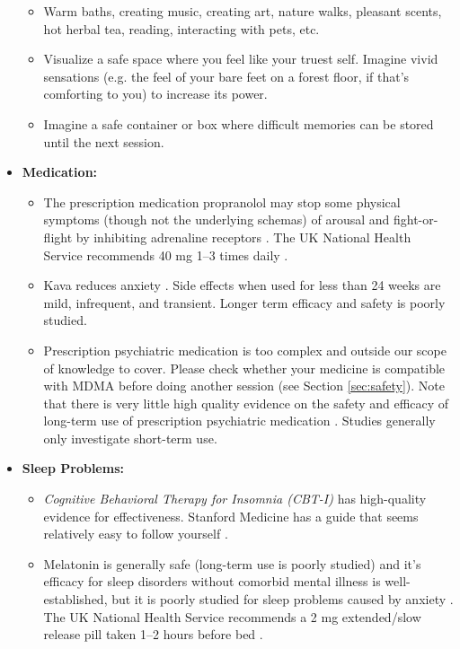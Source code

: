 \documentclass[12pt,letterpaper]{book}
\begin{document}
\begin{itemize}
\begin{itemize}
        \item Warm baths, creating music, creating art, nature walks, pleasant scents, hot herbal tea, reading, interacting with pets, etc.
        \item Visualize a safe space where you feel like your truest self. Imagine vivid sensations (e.g. the feel of your bare feet on a forest floor, if that's comforting to you) to increase its power.
        \item Imagine a safe container or box where difficult memories can be stored until the next session.
    \end{itemize}
    \item \textbf{Medication:}
    \begin{itemize}
        \item The prescription medication propranolol may stop some physical symptoms (though not the underlying schemas) of arousal and fight-or-flight by inhibiting adrenaline receptors \cite{steenenPropranalol}. The UK National Health Service recommends 40 mg 1–3 times daily \cite{nhsPropranalol}.
        \item Kava reduces anxiety \cite{Pittler03kava}. Side effects when used for less than 24 weeks are mild, infrequent, and transient. Longer term efficacy and safety is poorly studied.
        \item Prescription psychiatric medication is too complex and outside our scope of knowledge to cover. Please check whether your medicine is compatible with MDMA before doing another session (see Section \ref{sec:safety}). Note that there is very little high quality evidence on the safety and efficacy of long-term use of prescription psychiatric medication \cite{leuchtDecline}. Studies generally only investigate short-term use.
    \end{itemize}
    \item \textbf{Sleep Problems:}
    \begin{itemize}
        \item \textit{Cognitive Behavioral Therapy for Insomnia (CBT-I)} has high-quality evidence for effectiveness. Stanford Medicine has a guide that seems relatively easy to follow yourself \cite{stanfordSleep}.
        \item Melatonin is generally safe (long-term use is poorly studied) and it's efficacy for sleep disorders without comorbid mental illness is well-established, but it is poorly studied for sleep problems caused by anxiety \cite{moon2022role}. The UK National Health Service recommends a 2 mg extended/slow release pill taken 1–2 hours before bed \cite{nhsMelatonin}.

\end{itemize}
\end{itemize}
\end{document}
